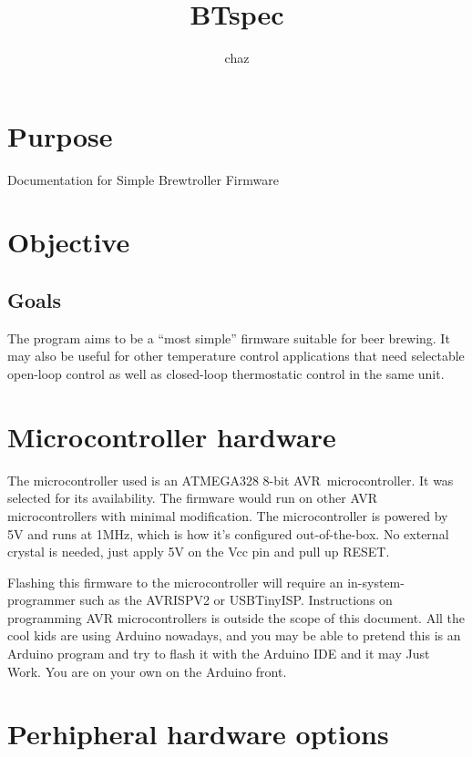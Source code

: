 \documentclass[dvips,12pt]{article}
\title{BTspec}
\author{chaz}
\begin{document}
\frenchspacing


\section{Purpose}
Documentation for Simple Brewtroller Firmware

\tableofcontents
\listoffigures


\section{Objective}

\subsection{Goals}

The program aims to be a ``most simple'' firmware suitable for beer
brewing. It may also be useful for other temperature control applications
that need selectable open-loop control as well as closed-loop thermostatic control in the same unit.

%
\section{Microcontroller hardware}

The microcontroller used is an ATMEGA328 8-bit AVR\textcopyright\
microcontroller. It was selected for its availability. The firmware would
run on other AVR microcontrollers with minimal modification. The
microcontroller is powered by 5V and runs at 1MHz, which is how
it's configured out-of-the-box. No external crystal is needed, just apply
5V on the Vcc pin and pull up RESET. 

Flashing this firmware to the
microcontroller will require an in-system-programmer such as the AVRISPV2
or USBTinyISP. Instructions on programming AVR microcontrollers is outside
the scope of this document. All the cool kids are using Arduino nowadays,
and you may be able to pretend this is an Arduino program and try to flash
it with the Arduino IDE and it may Just Work. You are on your own on the Arduino
front.

\section{Perhipheral hardware options}
\end{document}

